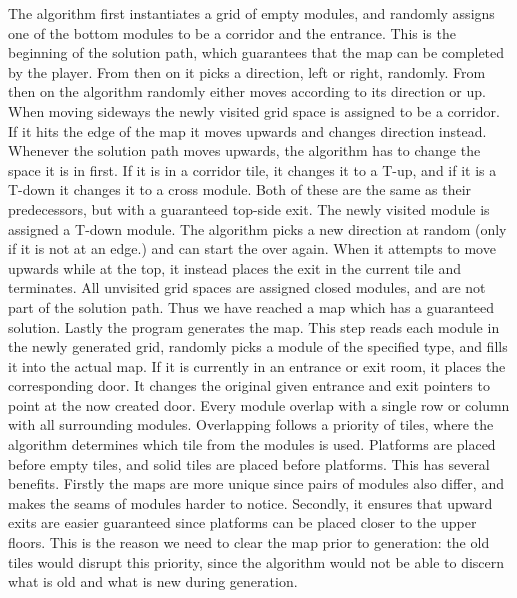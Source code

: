 The algorithm first instantiates a grid of empty modules, and randomly assigns one of the bottom modules to be a corridor and the entrance. This is the beginning of the solution path, which guarantees that the map can be completed by the player. From then on it picks a direction, left or right, randomly. From then on the algorithm randomly either moves according to its direction or up. When moving sideways the newly visited grid space is assigned to be a corridor. If it hits the edge of the map it moves upwards and changes direction instead. Whenever the solution path moves upwards, the algorithm has to change the space it is in first. If it is in a corridor tile, it changes it to a T-up, and if it is a T-down it changes it to a cross module. Both of these are the same as their predecessors, but with a guaranteed top-side exit. The newly visited module is assigned a T-down module. The algorithm picks a new direction at random (only if it is not at an edge.) and can start the over again. When it attempts to move upwards while at the top, it instead places the exit in the current tile and terminates. All unvisited grid spaces are assigned closed modules, and are not part of the solution path. Thus we have reached a map which has a guaranteed solution.
\newline
Lastly the program generates the map. This step reads each module in the newly generated grid, randomly picks a module of the specified type, and fills it into the actual map. If it is currently in an entrance or exit room, it places the corresponding door. It changes the original given entrance and exit pointers to
point at the now created door.
\newline
Every module overlap with a single row or column with all surrounding modules. Overlapping follows a priority of tiles, where the algorithm determines which tile from the modules is used. Platforms are placed before empty tiles, and solid tiles are placed before platforms. This has several benefits. Firstly the maps are more unique since pairs of modules also differ, and makes the seams of modules harder to notice. Secondly, it ensures that upward exits are easier guaranteed since platforms can be placed closer to the upper floors. This is the reason we need to clear the map prior to generation: the old tiles would disrupt this priority, since the algorithm would not be able to discern what is old and what is new during
generation.

